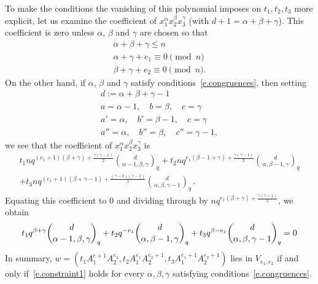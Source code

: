 \documentclass[12pt]{amsart}
\numberwithin{equation}{section}
\numberwithin{subsection}{section}
\theoremstyle{definition} \newtheorem{definition}[theorem]{Definition}
\begin{document}
To make the conditions the vanishing of this polynomial 
imposes on $t_1, t_2, t_3$ more explicit, let us
examine the coefficient of $x_1^{\alpha} x_2^{\beta} x_3^{\gamma}$ 
(with $d + 1 = \alpha + \beta + \gamma$).
This coefficient is zero unless
$\alpha$, $\beta$ and $\gamma$ are chosen so that 
\begin{equation} \label{e.congruences}
\begin{array}{l}
\alpha + \beta + \gamma \leqslant n \\ 
\alpha + \gamma +  e_1 \equiv 0 \pmod{n} \\
\beta + \gamma + e_2 \equiv 0 \pmod{n}. 
\end{array}
\end{equation}
On the other hand, if $\alpha$, $\beta$ and $\gamma$ satisfy
conditions~\eqref{e.congruences}, then setting
\begin{gather}
\nonumber
d := \alpha + \beta + \gamma -1 \\
\nonumber
a = \alpha - 1, \quad b = \beta, \quad c = \gamma \\
\nonumber
a' = \alpha , \quad b' = \beta -1 , \quad c = \gamma \\
\nonumber
a'' = \alpha, \quad b'' = \beta, \quad c'' = \gamma -1,
\end{gather}
we see that the coefficient of
$x_1^{\alpha} x_2^{\beta} x_3^{\gamma}$ is
\begin{gather}  
\nonumber
t_1 nq^{(e_1+1)(\beta + \gamma) + \frac{\gamma(\gamma-1)}{2}} 
\binom{d}{\alpha-1, \beta, \gamma}_q   
+ t_2 nq^{e_1(\beta - 1 + \gamma) + \frac{\gamma(\gamma -1)}{2}} 
\binom{d}{\alpha, \beta -1, \gamma}_q \\
\nonumber
+ t_3 nq^{(e_1 + 1)(\beta + \gamma - 1) + \frac{(\gamma -2)(\gamma - 1)}{2}} 
\binom{d}{\alpha, \beta, \gamma -1}_q \, . 
\end{gather}
Equating this coefficient to $0$ and
dividing through by $n q^{e_1(\beta + \gamma) + \frac{\gamma(\gamma -1)}{2}}$, 
we obtain
\begin{equation} \label{e.constraint1}
t_1 q^{\beta + \gamma} 
\binom{d}{\alpha-1, \beta, \gamma}_q +   
t_2 q^{-e_1} 
\binom{d}{\alpha, \beta -1, \gamma}_q \\
+ t_3 q^{\beta - e_1}
\binom{d}{\alpha, \beta, \gamma - 1}_q \\
= 0 
\end{equation}
In summary, $w = (t_1 A_1^{e+1} A_2^{e_2}, t_2 A_1^{e_1} A_2^{e_2 + 1}, 
t_3 A_1^{e_1 + 1} A_2^{e_2 + 1})$ lies in $V_{e_1, e_2}$ 
if and only if~\eqref{e.constraint1} holds 
for every $\alpha, \beta, \gamma$ satisfying 
conditions~\eqref{e.congruences}.  
\end{document}
